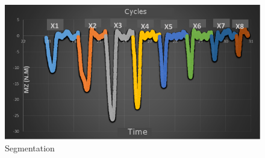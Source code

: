 	 \begin{figure}[h]
  \centering
   \includegraphics[scale=0.4]{images/sax-p/sax-p_deplacement32_thesee}
    \caption{Segmentation}
  \label{fig:segmentation}
  \end{figure}
	
